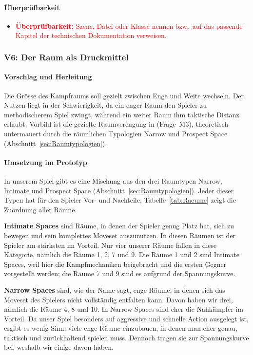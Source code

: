 \documentclass[../Main.tex]{subfiles}
\begin{document}
\paragraph{Überprüfbarkeit}
\begin{itemize}[leftmargin=1.5cm]
    \item \textcolor{red}{\textbf{Überprüfbarkeit:} Szene, Datei oder Klasse nennen bzw.\ auf das passende Kapitel der technischen Dokumentation verweisen.}
\end{itemize}

\subsubsection{V6: Der Raum als Druckmittel} \label{sec:V6}

\paragraph{Vorschlag und Herleitung}
Die Grösse des Kampfraums soll gezielt zwischen Enge und Weite wechseln. Der Nutzen liegt in der Schwierigkeit, da ein enger Raum den Spieler zu methodischerem Spiel zwingt, während ein weiter Raum ihm taktische Distanz erlaubt. Vorbild ist die gezielte Raumverengung in  (Frage~M3), theoretisch untermauert durch die räumlichen Typologien Narrow und Prospect Space (Abschnitt~\ref{sec:Raumtypologien}).

\paragraph{Umsetzung im Prototyp}
In unserem Spiel gibt es eine Mischung aus den drei Raumtypen Narrow, Intimate und Prospect Space (Abschnitt~\ref{sec:Raumtypologien}). Jeder dieser Typen hat für den Spieler Vor- und Nachteile; Tabelle~\ref{tab:Raeume} zeigt die Zuordnung aller Räume.

\textbf{Intimate Spaces} sind Räume, in denen der Spieler genug Platz hat, sich zu bewegen und sein komplettes Moveset auszunutzen. In diesen Räumen ist der Spieler am stärksten im Vorteil. Nur vier unserer Räume fallen in diese Kategorie, nämlich die Räume 1, 2, 7 und 9. Die Räume 1 und 2 sind Intimate Spaces, weil hier die Kampfmechaniken beigebracht und die ersten Gegner vorgestellt werden; die Räume 7 und 9 sind es aufgrund der Spannungskurve.

\textbf{Narrow Spaces} sind, wie der Name sagt, enge Räume, in denen sich das Moveset des Spielers nicht vollständig entfalten kann. Davon haben wir drei, nämlich die Räume 4, 8 und 10. In Narrow Spaces sind eher die Nahkämpfer im Vorteil. Da unser Spiel besonders auf aggressive und schnelle Action ausgelegt ist, ergibt es wenig Sinn, viele enge Räume einzubauen, in denen man eher genau, taktisch und zurückhaltend spielen muss. Dennoch tragen sie zur Spannungskurve bei, weshalb wir einige davon haben.
\end{document}
